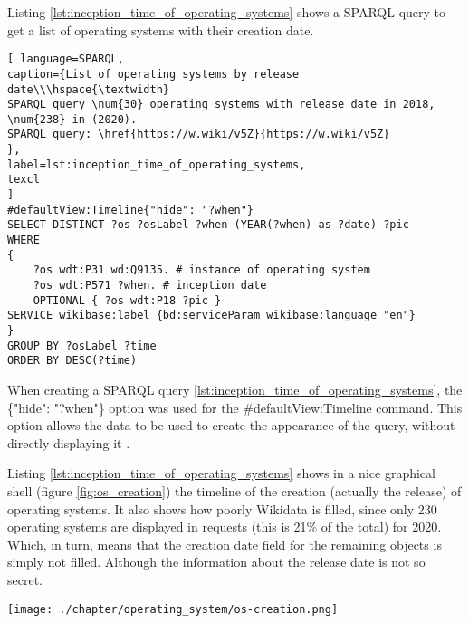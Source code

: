 Listing \ref{lst:inception_time_of_operating_systems} shows a SPARQL query to get a list of operating systems with their creation date.

\begin{lstlisting}[ language=SPARQL, 
caption={List of operating systems by release date\\\hspace{\textwidth}
SPARQL query \num{30} operating systems with release date in 2018, \num{238} in (2020).
SPARQL query: \href{https://w.wiki/v5Z}{https://w.wiki/v5Z}
},
label=lst:inception_time_of_operating_systems,
texcl 
]
#defaultView:Timeline{"hide": "?when"}
SELECT DISTINCT ?os ?osLabel ?when (YEAR(?when) as ?date) ?pic
WHERE
{
	?os wdt:P31 wd:Q9135. # instance of operating system
	?os wdt:P571 ?when. # inception date
	OPTIONAL { ?os wdt:P18 ?pic }
SERVICE wikibase:label {bd:serviceParam wikibase:language "en"}
}
GROUP BY ?osLabel ?time
ORDER BY DESC(?time)
\end{lstlisting}

When creating a SPARQL query \ref{lst:inception_time_of_operating_systems}, the \{"hide": "?when"\} option was used for the \#defaultView:Timeline command.
This option allows the data to be used to create the appearance of the query, without directly displaying it \cite{WQSResultViews}.

Listing \ref{lst:inception_time_of_operating_systems} shows in a nice graphical shell (figure \ref{fig:os_creation}) the timeline of the creation (actually the release)
of operating systems. It also shows how poorly Wikidata is filled, since only \num{230} operating systems are displayed in requests (this is 21\% of the total) for 2020. Which, in turn, means that the creation date field for the remaining objects is simply not filled. Although the information about the release date is not so secret.

\begin{figure*}[h!]
	\texttt{[image: ./chapter/operating\_system/os-creation.png]}
	\caption{Part of a timeline with operating system release dates from 1955 to 2020}
	\label{fig:os_creation}
\end{figure*}

